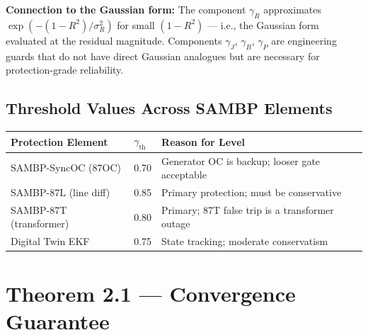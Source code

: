 \documentclass[12pt,a4paper]{article}
\newcommand{\gammath}{\gamma_\mathrm{th}}
\begin{document}
\textbf{Connection to the Gaussian form:}  The component $\gamma_R$ approximates
$\exp(-(1-R^2)/\sigma_R^2)$ for small $(1-R^2)$ --- i.e., the Gaussian form
evaluated at the residual magnitude.  Components $\gamma_J$, $\gamma_B$, $\gamma_P$
are engineering guards that do not have direct Gaussian analogues but are
necessary for protection-grade reliability.

\subsection{Threshold Values Across SAMBP Elements}

\begin{center}
\begin{tabular}{@{}lll@{}}
\toprule
\textbf{Protection Element} & \textbf{$\gammath$} & \textbf{Reason for Level} \\
\midrule
SAMBP-SyncOC (87OC)  & 0.70 & Generator OC is backup; looser gate acceptable \\
SAMBP-87L (line diff)& 0.85 & Primary protection; must be conservative \\
SAMBP-87T (transformer)& 0.80 & Primary; 87T false trip is a transformer outage \\
Digital Twin EKF     & 0.75 & State tracking; moderate conservatism \\
\bottomrule
\end{tabular}
\end{center}

\section{Theorem 2.1 --- Convergence Guarantee}
\end{document}
